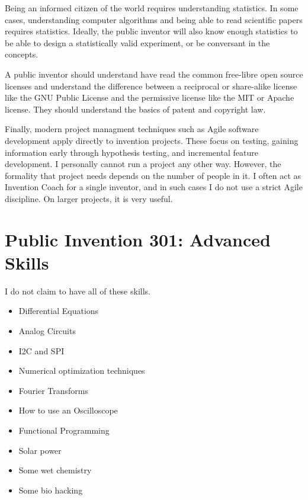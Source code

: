\documentclass[
	fontsize=10pt, %
	twoside=false, %
	secnumdepth=1, %
]{kaobook}
\begin{document}
Being an informed citizen of the world requires understanding statistics.
In some cases, understanding computer algorithms and being able to read
scientific papers requires statistics. Ideally, the public inventor
will also know enough statistics to be able to design a statistically
valid experiment, or be conversant in the concepts.

A public inventor should understand have read the common free-libre open
source licenses and understand the difference between a reciprocal or share-alike
license like the GNU Public License and the permissive license like the MIT
or Apache license. They should understand the basics of patent and copyright law.

Finally, modern project managment techniques such as Agile software development
apply directly to invention projects. These focus on testing,
gaining information early through hypothesis testing, and incremental
feature development. I personally cannot run a project any other way.
However, the formality that project needs depends on the number of people
in it. I often act as Invention Coach for a single inventor, and in such
cases I do not use a strict Agile discipline. On larger projects, it
is very useful.


\chapter{Public Invention 301: Advanced Skills}


I do not claim to have all of these skills.

\begin{itemize}
\item Differential Equations
\item Analog Circuits
  \item I2C and SPI
\item Numerical optimization techniques
\item Fourier Transforms
\item How to use an Oscilloscope
\item Functional Programming
\item Solar power
\item Some wet chemistry
  \item Some bio hacking
  \end{itemize}
\end{document}
